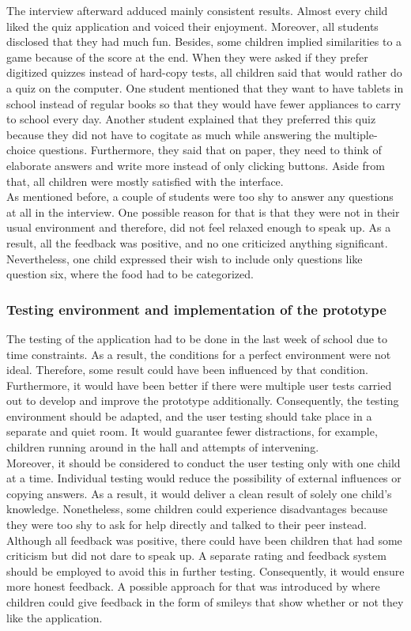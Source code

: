 The interview afterward adduced mainly consistent results. Almost every child liked the quiz application and voiced their enjoyment. Moreover, all students disclosed that they had much fun. Besides, some children implied similarities to a game because of the score at the end.
When they were asked if they prefer digitized quizzes instead of hard-copy tests, all children said that would rather do a quiz on the computer. One student mentioned that they want to have tablets in school instead of regular books so that they would have fewer appliances to carry to school every day. Another student explained that they preferred this quiz because they did not have to cogitate as much while answering the multiple-choice questions. Furthermore, they said that on paper, they need to think of elaborate answers and write more instead of only clicking buttons. Aside from that, all children were mostly satisfied with the interface.\\
As mentioned before, a couple of students were too shy to answer any questions at all in the interview. One possible reason for that is that they were not in their usual environment and therefore, did not feel relaxed enough to speak up. As a result, all the feedback was positive, and no one criticized anything significant. Nevertheless, one child expressed their wish to include only questions like question six, where the food had to be categorized. 

\subsubsection{Testing environment and implementation of the prototype}
The testing of the application had to be done in the last week of school due to time constraints. As a result, the conditions for a perfect environment were not ideal. Therefore, some result could have been influenced by that condition. Furthermore, it would have been better if there were multiple user tests carried out to develop and improve the prototype additionally. Consequently, the testing environment should be adapted, and the user testing should take place in a separate and quiet room. It would guarantee fewer distractions, for example, children running around in the hall and attempts of intervening.\\
Moreover, it should be considered to conduct the user testing only with one child at a time. Individual testing would reduce the possibility of external influences or copying answers. As a result, it would deliver a clean result of solely one child's knowledge. Nonetheless, some children could experience disadvantages because they were too shy to ask for help directly and talked to their peer instead.\\
Although all feedback was positive, there could have been children that had some criticism but did not dare to speak up. A separate rating and feedback system should be employed to avoid this in further testing. Consequently, it would ensure more honest feedback. A possible approach for that was introduced by \textcite{alhussayen2015evaluating} where children could give feedback in the form of smileys that show whether or not they like the application.

